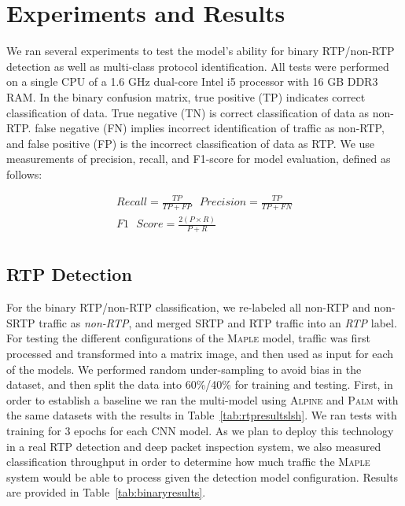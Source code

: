 \section{Experiments and Results}

We ran several experiments to test the model's ability for binary RTP/non-RTP detection as well as multi-class protocol identification. All tests were performed on a single CPU of a 1.6 GHz dual-core Intel i5 processor with 16 GB DDR3 RAM. In the binary confusion matrix, true positive (TP) indicates correct classification of data. True negative (TN) is correct classification of data as non-RTP. false negative (FN) implies incorrect identification of traffic as non-RTP, and false positive (FP) is the incorrect classification of data as RTP. We use measurements of precision, recall, and F1-score for model evaluation, defined as follows:

\begin{equation}
\begin{split}
    Recall = \frac{TP}{TP + FP} \text{  }
    Precision = \frac{TP}{TP + FN} \\
    F1\text{ }Score = \frac{2(P\times R)}{P + R} \\
    \end{split}
\end{equation}

\subsection{RTP Detection}

For the binary RTP/non-RTP classification, we re-labeled all non-RTP and non-SRTP traffic as \textit{non-RTP}, and merged SRTP and RTP traffic into an \textit{RTP} label. For testing the different configurations of the \textsc{Maple} model, traffic was first processed and transformed into a matrix image, and then used as input for each of the models. We performed random under-sampling to avoid bias in the dataset, and then split the data into 60\%/40\% for training and testing. First, in order to establish a baseline we ran the multi-model using \textsc{Alpine} and \textsc{Palm} with the same datasets with the results in Table~\ref{tab:rtpresultslsh}. We ran tests with training for $3$ epochs for each CNN model. As we plan to deploy this technology in a real RTP detection and deep packet inspection system, we also measured classification throughput in order to determine how much traffic the \textsc{Maple} system would be able to process given the detection model configuration. Results are provided in Table~\ref{tab:binaryresults}.


